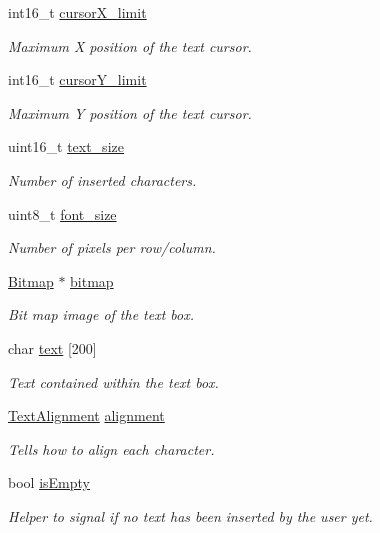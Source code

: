 \begin{DoxyCompactItemize}
int16\+\_\+t \mbox{\hyperlink{group__textbox_gaab8db5873b8af1889aaef0a088383d07}{cursor\+X\+\_\+limit}}
\begin{DoxyCompactList}\small\item\em Maximum X position of the text cursor. \end{DoxyCompactList}\item 
int16\+\_\+t \mbox{\hyperlink{group__textbox_gaba5e128238452d3662929d023ab898cb}{cursor\+Y\+\_\+limit}}
\begin{DoxyCompactList}\small\item\em Maximum Y position of the text cursor. \end{DoxyCompactList}\item 
uint16\+\_\+t \mbox{\hyperlink{group__textbox_ga5c78afd9fd951002d6b87a3cfffe27b8}{text\+\_\+size}}
\begin{DoxyCompactList}\small\item\em Number of inserted characters. \end{DoxyCompactList}\item 
uint8\+\_\+t \mbox{\hyperlink{group__textbox_ga2279e6ddc6b689e797f73fbee37f2681}{font\+\_\+size}}
\begin{DoxyCompactList}\small\item\em Number of pixels per row/column. \end{DoxyCompactList}\item 
\mbox{\hyperlink{struct_bitmap}{Bitmap}} $\ast$ \mbox{\hyperlink{group__textbox_gadde5ca94c24a93bc01b4307b51cb9e3f}{bitmap}}
\begin{DoxyCompactList}\small\item\em Bit map image of the text box. \end{DoxyCompactList}\item 
char \mbox{\hyperlink{group__textbox_ga103b4d17950a13af1b186c09809567a3}{text}} \mbox{[}200\mbox{]}
\begin{DoxyCompactList}\small\item\em Text contained within the text box. \end{DoxyCompactList}\item 
\mbox{\hyperlink{group__textbox_gaa56f1a82069b5feeadbb4591cb3e474f}{Text\+Alignment}} \mbox{\hyperlink{group__textbox_gaf8595fd6bcd01e16bbaab3da5474c2ed}{alignment}}
\begin{DoxyCompactList}\small\item\em Tells how to align each character. \end{DoxyCompactList}\item 
bool \mbox{\hyperlink{group__textbox_gad8bde595ae368fa4850cb6c05d153957}{is\+Empty}}
\begin{DoxyCompactList}\small\item\em Helper to signal if no text has been inserted by the user yet. \end{DoxyCompactList}\end{DoxyCompactItemize}


